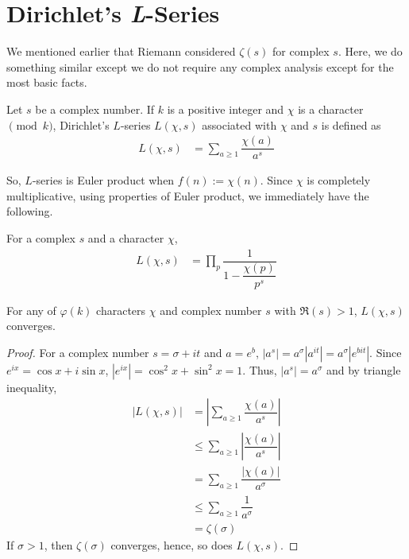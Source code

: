 \documentclass[elemannt.tex]{subfile}
\begin{document}
	\section{Dirichlet's \textit{L}-Series}
	We mentioned earlier that Riemann considered $\zeta(s)$ for complex $s$. Here, we do something similar except we do not require any complex analysis except for the most basic facts.
		\begin{definition}[$L$-Series]
			Let $s$ be a complex number. If $k$ is a positive integer and $\chi$ is a character $\pmod{k}$, Dirichlet's $L$-series $L(\chi,s)$ associated with $\chi$ and $s$ is defined as
				\begin{align*}
					L(\chi, s)
						& = \sum_{a\geq 1}\dfrac{\chi(a)}{a^{s}}
				\end{align*}
		\end{definition}
	So, $L$-series is Euler product when $f(n):=\chi(n)$. Since $\chi$ is completely multiplicative, using properties of Euler product, we immediately have the following.
		\begin{proposition}
			For a complex $s$ and a character $\chi$,
				\begin{align*}
					L(\chi, s)
						& = \prod_{p}\dfrac{1}{1-\dfrac{\chi(p)}{p^{s}}}
				\end{align*}
		\end{proposition}

		\begin{proposition}
			For any of $\varphi(k)$ characters $\chi$ and complex number $s$ with $\mathfrak{R}(s)>1$, $L(\chi, s)$ converges.
		\end{proposition}

		\begin{proof}
			For a complex number $s=\sigma+it$ and $a=e^{b}$, $|a^{s}|=a^{\sigma}|a^{it}|=a^{\sigma}|e^{bit}|$. Since $e^{ix}=\cos{x}+i\sin{x}$, $|e^{ix}|=\cos^{2}{x}+\sin^{2}{x}=1$. Thus, $|a^{s}|=a^{\sigma}$ and by triangle inequality,
				\begin{align*}
					|L(\chi,s)|
						& = \left|\sum_{a\geq 1}\dfrac{\chi(a)}{a^{s}}\right|\\
						& \leq \sum_{a\geq 1}\left|\dfrac{\chi(a)}{a^{s}}\right|\\
						& = \sum_{a\geq 1}\dfrac{|\chi(a)|}{a^{\sigma}}\\
						& \leq \sum_{a\geq 1}\dfrac{1}{a^{\sigma}}\\
						& = \zeta(\sigma)
				\end{align*}
			If $\sigma > 1$, then $\zeta(\sigma)$ converges, hence, so does $L(\chi, s)$.
		\end{proof}
\end{document}

